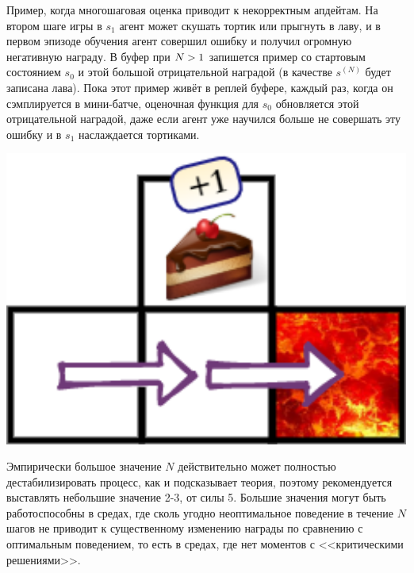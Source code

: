 \begin{exampleBox}[righthand ratio=0.2, sidebyside, sidebyside align=center, lower separated=false]{}
Пример, когда многошаговая оценка приводит к некорректным апдейтам. На втором шаге игры в $s_1$ агент может скушать тортик или прыгнуть в лаву, и в первом эпизоде обучения агент совершил ошибку и получил огромную негативную награду. В буфер при $N \HM> 1$ запишется пример со стартовым состоянием $s_0$ и этой большой отрицательной наградой (в качестве $s^{(N)}$ будет записана лава). Пока этот пример живёт в реплей буфере, каждый раз, когда он сэмплируется в мини-батче, оценочная функция для $s_0$ обновляется этой отрицательной наградой, даже если агент уже научился больше не совершать эту ошибку и в $s_1$ наслаждается тортиками.

\tcblower
\vspace{-0.3cm}
\begin{adjustwidth}{-0.6cm}{}
\includegraphics[width=1.15\textwidth]{Images/MultiStepBad.png} \hspace*{-1cm}
\end{adjustwidth}
\end{exampleBox}

\begin{remark}
Эмпирически большое значение $N$ действительно может полностью дестабилизировать процесс, как и подсказывает теория, поэтому рекомендуется выставлять небольшие значение 2-3, от силы 5. Большие значения могут быть работоспособны в средах, где сколь угодно неоптимальное поведение в течение $N$ шагов не приводит к существенному изменению награды по сравнению с оптимальным поведением, то есть в средах, где нет моментов с <<критическими решениями>>. 
\end{remark}
